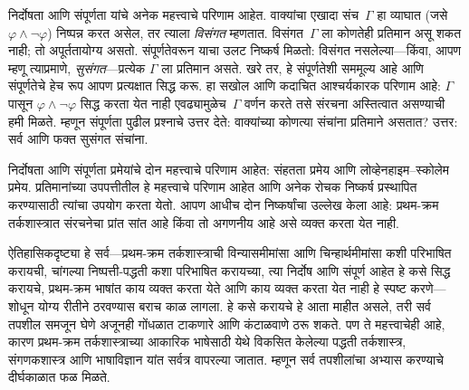 निर्दोषता आणि संपूर्णता यांचे अनेक महत्त्वाचे परिणाम आहेत.
वाक्यांचा एखादा संच~$\Gamma$ हा व्याघात (जसे
$\varphi \land \lnot \varphi$) निष्पन्न करत असेल, तर त्याला \emph{विसंगत}
म्हणतात. विसंगत~$\Gamma$ ला कोणतेही प्रतिमान असू शकत नाही; तो
अपूर्ततायोग्य असतो. संपूर्णतेवरून याचा उलट निष्कर्ष मिळतो: विसंगत
नसलेल्या---किंवा, आपण म्हणू त्याप्रमाणे, \emph{सुसंगत}---प्रत्येक
$\Gamma$ ला प्रतिमान असते. खरे तर, हे संपूर्णतेशी सममूल्य आहे आणि
संपूर्णतेचे हेच रूप आपण प्रत्यक्षात सिद्ध करू. हा सखोल आणि कदाचित
आश्चर्यकारक परिणाम आहे: $\Gamma$ पासून $\varphi \land \lnot \varphi$ सिद्ध करता
येत नाही एवढ्यामुळेच~$\Gamma$ वर्णन करते तसे संरचना अस्तित्वात
असण्याची हमी मिळते. म्हणून संपूर्णता पुढील प्रश्नाचे उत्तर देते:
वाक्यांच्या कोणत्या संचांना प्रतिमाने असतात? उत्तर: सर्व आणि फक्त
सुसंगत संचांना.

निर्दोषता आणि संपूर्णता प्रमेयांचे दोन महत्त्वाचे परिणाम आहेत: संहतता
प्रमेय आणि लोव्हेनहाइम--स्कोलेम प्रमेय. प्रतिमानांच्या उपपत्तीतील हे
महत्त्वाचे परिणाम आहेत आणि अनेक रोचक निष्कर्ष प्रस्थापित करण्यासाठी
त्यांचा उपयोग करता येतो. आपण आधीच दोन निष्कर्षांचा उल्लेख केला आहे:
प्रथम-क्रम तर्कशास्त्रात संरचनेचा प्रांत सांत आहे किंवा तो
अगणनीय आहे असे व्यक्त करता येत नाही.

ऐतिहासिकदृष्ट्या हे सर्व---प्रथम-क्रम तर्कशास्त्राची विन्यासमीमांसा आणि
चिन्हार्थमीमांसा कशी परिभाषित करायची, चांगल्या निष्पत्ती-पद्धती
कशा परिभाषित करायच्या, त्या निर्दोष आणि संपूर्ण आहेत हे कसे सिद्ध
करायचे, प्रथम-क्रम भाषांत काय व्यक्त करता येते आणि काय व्यक्त करता येत
नाही हे स्पष्ट करणे---शोधून योग्य रीतीने ठरवण्यास बराच काळ लागला. हे
कसे करायचे हे आता माहीत असले, तरी सर्व तपशील समजून घेणे अजूनही
गोंधळात टाकणारे आणि कंटाळवाणे ठरू शकते. पण ते महत्त्वाचेही आहे, कारण
प्रथम-क्रम तर्कशास्त्राच्या आकारिक भाषेसाठी येथे विकसित केलेल्या पद्धती
तर्कशास्त्र, संगणकशास्त्र आणि भाषाविज्ञान यांत सर्वत्र वापरल्या जातात.
म्हणून सर्व तपशीलांचा अभ्यास करण्याचे दीर्घकाळात फळ मिळते.



